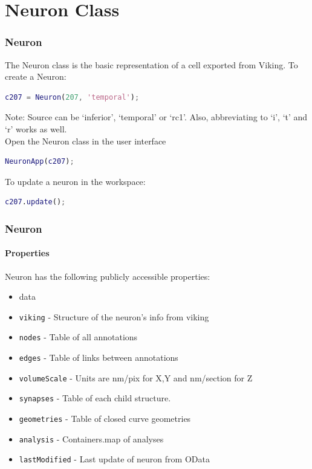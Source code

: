 \documentclass[11pt]{beamer}
\begin{document}
\section{Neuron Class}
\begin{frame}[fragile]
	\frametitle{Neuron}
	The Neuron class is the basic representation of a cell exported from Viking. To create a Neuron:
\begin{lstlisting}[language=matlab]
% cellName = Neuron(cellID, 'source');
c207 = Neuron(207, 'temporal');\end{lstlisting}
Note: Source can be `inferior', `temporal' or `rc1'. Also, abbreviating to `i', `t' and `r' works as well.\\
Open the Neuron class in the user interface
\begin{lstlisting}[language=matlab]
NeuronApp(c207);\end{lstlisting}
To update a neuron in the workspace:
\begin{lstlisting}[language=matlab]
c207.update();\end{lstlisting}
\end{frame}
\begin{frame}[fragile]
	\frametitle{Neuron}
	\framesubtitle{Properties}
	Neuron has the following publicly accessible properties:
	\begin{itemize}
		\item data
		\item \texttt{viking} - Structure of the neuron's info from viking
		\item \texttt{nodes} - Table of all annotations
		\item \texttt{edges} - Table of links between annotations
		\item \texttt{volumeScale} - Units are nm/pix for X,Y and nm/section for Z
		\item \texttt{synapses} - Table of each child structure.
		\item \texttt{geometries} - Table of closed curve geometries
		\item \texttt{analysis} - Containers.map of analyses
		\item \texttt{lastModified} - Last update of neuron from OData
	\end{itemize}
\end{frame}
\end{document}
